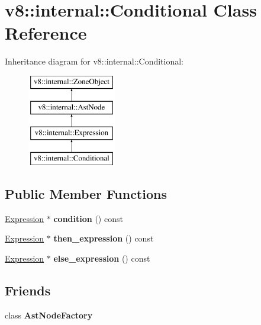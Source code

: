 \hypertarget{classv8_1_1internal_1_1Conditional}{}\section{v8\+:\+:internal\+:\+:Conditional Class Reference}
\label{classv8_1_1internal_1_1Conditional}
Inheritance diagram for v8\+:\+:internal\+:\+:Conditional\+:\begin{figure}[H]
\begin{center}
\leavevmode
\includegraphics[height=4.000000cm]{classv8_1_1internal_1_1Conditional}
\end{center}
\end{figure}
\subsection*{Public Member Functions}
\begin{DoxyCompactItemize}
\item 
\mbox{\label{classv8_1_1internal_1_1Conditional_a4cd9730a165c9764e7a77eccf2ac53bc}} 
\mbox{\hyperlink{classv8_1_1internal_1_1Expression}{Expression}} $\ast$ {\bfseries condition} () const
\item 
\mbox{\label{classv8_1_1internal_1_1Conditional_ae57d43b217a6d12944c0c3c8f696afdb}} 
\mbox{\hyperlink{classv8_1_1internal_1_1Expression}{Expression}} $\ast$ {\bfseries then\+\_\+expression} () const
\item 
\mbox{\label{classv8_1_1internal_1_1Conditional_af25030cf7154d93dcdf04e1d184145a8}} 
\mbox{\hyperlink{classv8_1_1internal_1_1Expression}{Expression}} $\ast$ {\bfseries else\+\_\+expression} () const
\end{DoxyCompactItemize}
\subsection*{Friends}
\begin{DoxyCompactItemize}
\item 
\mbox{\label{classv8_1_1internal_1_1Conditional_a8d587c8ad3515ff6433eb83c578e795f}} 
class {\bfseries Ast\+Node\+Factory}
\end{DoxyCompactItemize}
